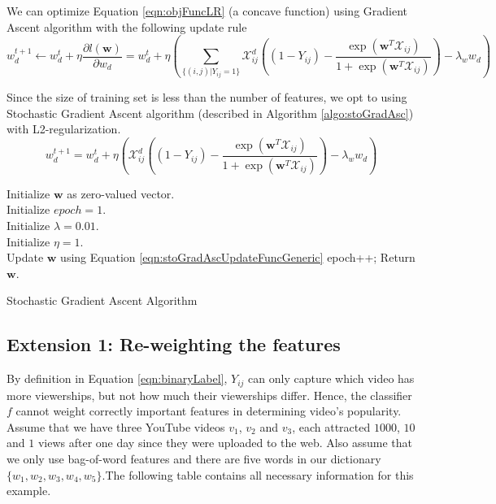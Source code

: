 	We can optimize Equation \ref{eqn:objFuncLR} (a concave function) using Gradient Ascent algorithm with the following update rule
		\begin{equation}
		w^{t+1}_d \leftarrow w^t_d + \eta \frac{\partial l(\textbf{w})}{\partial w_d} = w^t_d + \eta (\sum_{\{(i,j)|Y_{ij}=1\}} \mathcal{X}_{ij}^d ( (1 - Y_{ij}) - \frac{\exp(\textbf{w}^T\mathcal{X}_{ij})}{1 + \exp(\textbf{w}^T\mathcal{X}_{ij})})  - \lambda_w w_d)
		\end{equation}

	Since the size of training set is less than the number of features, we opt to using Stochastic Gradient Ascent algorithm (described in Algorithm \ref{algo:stoGradAsc}) with L2-regularization.
		\begin{equation}
		\label{eqn:stoGradAscUpdateFunc}
		w^{t+1}_d = w^t_d + \eta (\mathcal{X}_{ij}^d ( (1 - Y_{ij}) - \frac{\exp(\textbf{w}^T\mathcal{X}_{ij})}{1 + \exp(\textbf{w}^T\mathcal{X}_{ij})})  - \lambda_w w_d)
		\end{equation}

	\begin{algorithm}[h]\small
		Initialize $\textbf{w}$ as zero-valued vector.\\
		Initialize $epoch = 1$.\\
		Initialize $\lambda = 0.01$.\\
		Initialize $\eta = 1$.\\
		 {
			 {
				Update $\textbf{w}$ using Equation \ref{eqn:stoGradAscUpdateFuncGeneric}
			}    
			epoch++;
		}
		Return $\textbf{w}$.
		\caption{Stochastic Gradient Ascent Algorithm} \label{algo:stoGradAsc}
	\end{algorithm}

\subsection{Extension 1: Re-weighting the features}
\label{subsec:ext1}
	By definition in Equation \ref{eqn:binaryLabel}, $Y_{ij}$ can only capture which video has more viewerships, but not how much their viewerships differ. Hence, the classifier $f$ cannot weight correctly important features in determining video's popularity. Assume that we have three YouTube videos $v_1$, $v_2$ and $v_3$, each attracted $1000$, $10$ and $1$ views after one day since they were uploaded to the web. Also assume that we only use bag-of-word features and there are five words in our dictionary $\{w_1, w_2, w_3, w_4, w_5\}$.The following table contains all necessary information for this example.

